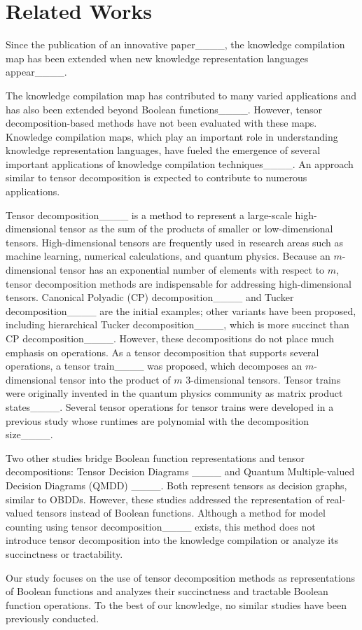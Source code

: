 \section{Related Works}
Since the publication of an innovative paper____, the knowledge compilation map has been extended when new knowledge representation languages appear____.

The knowledge compilation map has contributed to many varied applications and has also been extended beyond Boolean functions____. However, tensor decomposition-based methods have not been evaluated with these maps.
Knowledge compilation maps, which play an important role in understanding knowledge representation languages, have fueled the emergence of several important applications of knowledge compilation techniques____.
An approach similar to tensor decomposition is expected to contribute to numerous applications.

Tensor decomposition____ is a method to represent a large-scale high-dimensional tensor as the sum of the products of smaller or low-dimensional tensors.
High-dimensional tensors are frequently used in research areas such as machine learning, numerical calculations, and quantum physics. Because an $m$-dimensional tensor has an exponential number of elements with respect to $m$, tensor decomposition methods are indispensable for addressing high-dimensional tensors.
Canonical Polyadic (CP) decomposition____ and Tucker decomposition____ are the initial examples; other variants have been proposed, including hierarchical Tucker decomposition____, which is more succinct than CP decomposition____.
However, these decompositions do not place much emphasis on operations.
As a tensor decomposition that supports several operations, a tensor train____ was proposed, which decomposes an $m$-dimensional tensor into the product of $m$ 3-dimensional tensors.
Tensor trains were originally invented in the quantum physics community as matrix product states____. Several tensor operations for tensor trains were developed in a previous study whose runtimes are polynomial with the decomposition size____.

Two other studies bridge Boolean function representations and tensor decompositions: Tensor Decision Diagrams ____ and {Quantum Multiple-valued Decision Diagrams} (QMDD) ____.
Both represent tensors as decision graphs, similar to OBDDs.
However, these studies addressed the representation of real-valued tensors instead of Boolean functions.
Although a method for model counting using tensor decomposition____ exists, this method does not introduce tensor decomposition into the knowledge compilation or analyze its succinctness or tractability.

Our study focuses on the use of tensor decomposition methods as representations of Boolean functions and analyzes their succinctness and tractable Boolean function operations.
To the best of our knowledge, no similar studies have been previously conducted.